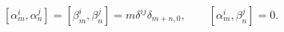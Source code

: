 \begin{equation}
\left[ \alpha _{m}^{i},\alpha _{n}^{j}\right] = \left[ \beta _{m}^{i},\beta
_{n}^{j}\right] =m\delta ^{ij}\delta _{m+n,0}, \qquad
\left[ \alpha _{m}^{i},\beta _{n}^{j}\right]=0.
\end{equation} 

